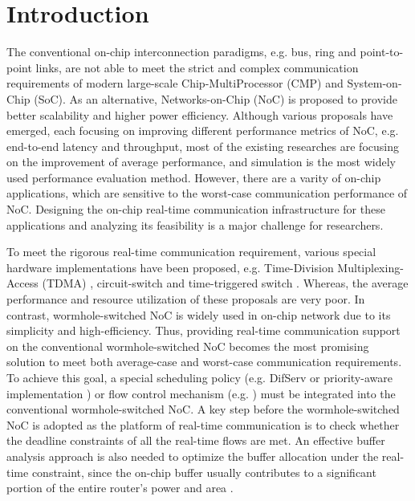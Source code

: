 \documentclass[preprint]{elsarticle}
\begin{document}
\linenumbers

\section{Introduction}
The conventional on-chip interconnection paradigms, e.g. bus, ring and point-to-point links, are not able to meet the strict and complex communication requirements of modern large-scale Chip-MultiProcessor (CMP) and System-on-Chip (SoC). As an alternative, Networks-on-Chip (NoC) is proposed to provide better scalability and higher power efficiency. Although various proposals have emerged, each focusing on improving different performance metrics of NoC, e.g. end-to-end latency and throughput, most of the existing researches are focusing on the improvement of average performance, and simulation is the most widely used performance evaluation method. However, there are a varity of on-chip applications, which are sensitive to the worst-case communication performance of NoC. Designing the on-chip real-time communication infrastructure for these applications and analyzing its feasibility is a major challenge for researchers.

To meet the rigorous real-time communication requirement, various special hardware implementations have been proposed, e.g. Time-Division Multiplexing-Access (TDMA) \cite{GoDR05}, circuit-switch \cite{6628254} and time-triggered switch \cite{4617280}. Whereas, the average performance and resource utilization of these proposals are very poor. In contrast, wormhole-switched NoC is widely used in on-chip network due to its simplicity and high-efficiency. Thus, providing real-time communication support on the conventional wormhole-switched NoC becomes the most promising solution to meet both average-case and worst-case communication requirements. To achieve this goal, a special scheduling policy (e.g. DifServ \cite{1411140} or priority-aware implementation \cite{Shi:2008:RCA:1397757.1397996,708526,627905}) or flow control mechanism (e.g. \cite{Li199649,707545}) must be integrated into the conventional wormhole-switched NoC. A key step before the wormhole-switched NoC is adopted as the platform of real-time communication is to check whether the deadline constraints of all the real-time flows are met. An effective buffer analysis approach is also needed to optimize the buffer allocation under the real-time constraint, since the on-chip buffer usually contributes to a significant portion of the entire router's power and area \cite{pkundu,5507566}.
\end{document}
